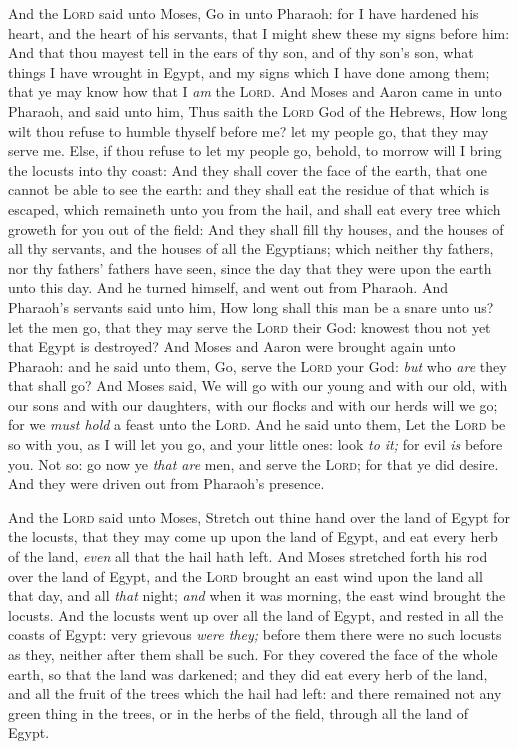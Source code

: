\documentclass[11pt,letterpaper,oneside]{memoir}
\begin{document}
And the \textsc{Lord} said unto Moses, Go in unto Pharaoh: for I have
hardened his heart, and the heart of his servants, that I might shew
these my signs before him: And that thou mayest tell in the ears of thy
son, and of thy son's son, what things I have wrought in Egypt, and my
signs which I have done among them; that ye may know how that I
\emph{am} the \textsc{Lord}. And Moses and Aaron came in unto Pharaoh,
and said unto him, Thus saith the \textsc{Lord} God of the Hebrews, How
long wilt thou refuse to humble thyself before me? let my people go,
that they may serve me. Else, if thou refuse to let my people go,
behold, to morrow will I bring the locusts into thy coast: And they
shall cover the face of the earth, that one cannot be able to see the
earth: and they shall eat the residue of that which is escaped, which
remaineth unto you from the hail, and shall eat every tree which groweth
for you out of the field: And they shall fill thy houses, and the houses
of all thy servants, and the houses of all the Egyptians; which neither
thy fathers, nor thy fathers' fathers have seen, since the day that they
were upon the earth unto this day. And he turned himself, and went out
from Pharaoh. And Pharaoh's servants said unto him, How long shall this
man be a snare unto us? let the men go, that they may serve the
\textsc{Lord} their God: knowest thou not yet that Egypt is destroyed?
And Moses and Aaron were brought again unto Pharaoh: and he said unto
them, Go, serve the \textsc{Lord} your God: \emph{but} who \emph{are}
they that shall go? And Moses said, We will go with our young and with
our old, with our sons and with our daughters, with our flocks and with
our herds will we go; for we \emph{must hold} a feast unto the
\textsc{Lord}. And he said unto them, Let the \textsc{Lord} be so with
you, as I will let you go, and your little ones: look \emph{to it;} for
evil \emph{is} before you. Not so: go now ye \emph{that are} men, and
serve the \textsc{Lord}; for that ye did desire. And they were driven
out from Pharaoh's presence.

And the \textsc{Lord} said unto Moses, Stretch out thine hand over the
land of Egypt for the locusts, that they may come up upon the land of
Egypt, and eat every herb of the land, \emph{even} all that the hail
hath left. And Moses stretched forth his rod over the land of Egypt, and
the \textsc{Lord} brought an east wind upon the land all that day, and
all \emph{that} night; \emph{and} when it was morning, the east wind
brought the locusts. And the locusts went up over all the land of Egypt,
and rested in all the coasts of Egypt: very grievous \emph{were they;}
before them there were no such locusts as they, neither after them shall
be such. For they covered the face of the whole earth, so that the land
was darkened; and they did eat every herb of the land, and all the fruit
of the trees which the hail had left: and there remained not any green
thing in the trees, or in the herbs of the field, through all the land
of Egypt.
\end{document}
